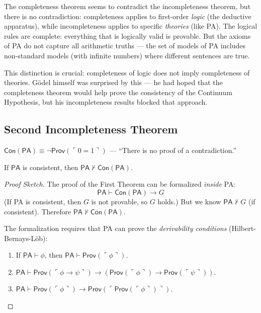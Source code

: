 The completeness theorem seems to contradict the incompleteness theorem, but there is no contradiction: completeness applies to first-order \emph{logic} (the deductive apparatus), while incompleteness applies to specific \emph{theories} (like PA). The logical rules are complete: everything that is logically valid is provable. But the axioms of PA do not capture all arithmetic truths --- the set of models of PA includes non-standard models (with infinite numbers) where different sentences are true.

This distinction is crucial: completeness of logic does not imply completeness of theories. Gödel himself was surprised by this --- he had hoped that the completeness theorem would help prove the consistency of the Continuum Hypothesis, but his incompleteness results blocked that approach.

\subsection{Second Incompleteness Theorem}
\label{sec:godel:second}

\begin{definition}
$\mathsf{Con}(\mathsf{PA}) \equiv \neg \mathsf{Prov}(\ulcorner 0=1 \urcorner)$ --- ``There is no proof of a contradiction.''
\end{definition}

\begin{theorem}
If $\mathsf{PA}$ is consistent, then $\mathsf{PA} \nvdash \mathsf{Con}(\mathsf{PA})$.
\end{theorem}

\begin{proof}[Proof Sketch]
The proof of the First Theorem can be formalized \emph{inside} PA:
\[
\mathsf{PA} \vdash \mathsf{Con}(\mathsf{PA}) \to G
\]
(If PA is consistent, then $G$ is not provable, so $G$ holds.) But we know $\mathsf{PA} \nvdash G$ (if consistent). Therefore $\mathsf{PA} \nvdash \mathsf{Con}(\mathsf{PA})$.

The formalization requires that PA can prove the \emph{derivability conditions} (Hilbert-Bernays-Löb):
\begin{enumerate}
\item If $\mathsf{PA} \vdash \phi$, then $\mathsf{PA} \vdash \mathsf{Prov}(\ulcorner \phi \urcorner)$.
\item $\mathsf{PA} \vdash \mathsf{Prov}(\ulcorner \phi \to \psi \urcorner) \to (\mathsf{Prov}(\ulcorner \phi \urcorner) \to \mathsf{Prov}(\ulcorner \psi \urcorner))$.
\item $\mathsf{PA} \vdash \mathsf{Prov}(\ulcorner \phi \urcorner) \to \mathsf{Prov}(\ulcorner \mathsf{Prov}(\ulcorner \phi \urcorner) \urcorner)$.
\end{enumerate}
\end{proof}

